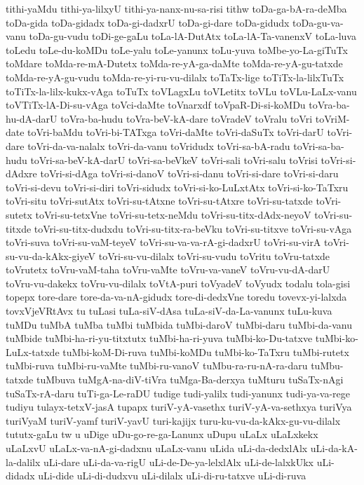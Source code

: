 {tithi-yaMdu
tithi-ya-lilxyU
tithi-ya-nanx-nu-sa-risi
tithw
toDa-ga-bA-ra-deMba
toDa-gida
toDa-gidadx
toDa-gi-dadxrU
toDa-gi-dare
toDa-gidudx
toDa-gu-va-vanu
toDa-gu-vudu
toDi-ge-gaLu
toLa-lA-DutAtx
toLa-lA-Ta-vanenxV
toLa-luva
toLedu
toLe-du-koMDu
toLe-yalu
toLe-yanunx
toLu-yuva
toMbe-yo-La-giTuTx
toMdare
toMda-re-mA-Dutetx
toMda-re-yA-ga-daMte
toMda-re-yA-gu-tatxde
toMda-re-yA-gu-vudu
toMda-re-yi-ru-vu-dilalx
toTaTx-lige
toTiTx-la-lilxTuTx
toTiTx-la-lilx-kukx-vAga
toTuTx
toVLagxLu
toVLetitx
toVLu
toVLu-LaLx-vanu
toVTiTx-lA-Di-su-vAga
toVci-daMte
toVnarxdf
toVpaR-Di-si-koMDu
toVra-ba-hu-dA-darU
toVra-ba-hudu
toVra-beV-kA-dare
toVradeV
toVralu
toVri
toVriM-date
toVri-baMdu
toVri-bi-TATxga
toVri-daMte
toVri-daSuTx
toVri-darU
toVri-dare
toVri-da-va-nalalx
toVri-da-vanu
toVridudx
toVri-sa-bA-radu
toVri-sa-ba-hudu
toVri-sa-beV-kA-darU
toVri-sa-beVkeV
toVri-sali
toVri-salu
toVrisi
toVri-si-dAdxre
toVri-si-dAga
toVri-si-danoV
toVri-si-danu
toVri-si-dare
toVri-si-daru
toVri-si-devu
toVri-si-diri
toVri-sidudx
toVri-si-ko-LuLxtAtx
toVri-si-ko-TaTxru
toVri-situ
toVri-sutAtx
toVri-su-tAtxne
toVri-su-tAtxre
toVri-su-tatxde
toVri-sutetx
toVri-su-tetxVne
toVri-su-tetx-neMdu
toVri-su-titx-dAdx-neyoV
toVri-su-titxde
toVri-su-titx-dudxdu
toVri-su-titx-ra-beVku
toVri-su-titxve
toVri-su-vAga
toVri-suva
toVri-su-vaM-teyeV
toVri-su-va-va-rA-gi-dadxrU
toVri-su-virA
toVri-su-vu-da-kAkx-giyeV
toVri-su-vu-dilalx
toVri-su-vudu
toVritu
toVru-tatxde
toVrutetx
toVru-vaM-taha
toVru-vaMte
toVru-va-vaneV
toVru-vu-dA-darU
toVru-vu-dakekx
toVru-vu-dilalx
toVtA-puri
toVyadeV
toVyudx
todalu
tola-gisi
topepx
tore-dare
tore-da-va-nA-gidudx
tore-di-dedxVne
toredu
tovevx-yi-lalxda
tovxVjeVRtAvx
tu
tuLasi
tuLa-siV-dAsa
tuLa-siV-da-La-vanunx
tuLu-kuva
tuMDu
tuMbA
tuMba
tuMbi
tuMbida
tuMbi-daroV
tuMbi-daru
tuMbi-da-vanu
tuMbide
tuMbi-ha-ri-yu-titxtutx
tuMbi-ha-ri-yuva
tuMbi-ko-Du-tatxve
tuMbi-ko-LuLx-tatxde
tuMbi-koM-Di-ruva
tuMbi-koMDu
tuMbi-ko-TaTxru
tuMbi-rutetx
tuMbi-ruva
tuMbi-ru-vaMte
tuMbi-ru-vanoV
tuMbu-ra-ru-nA-ra-daru
tuMbu-tatxde
tuMbuva
tuMgA-na-diV-tiVra
tuMga-Ba-derxya
tuMturu
tuSaTx-nAgi
tuSaTx-rA-daru
tuTi-ga-Le-raDU
tudige
tudi-yalilx
tudi-yanunx
tudi-ya-va-rege
tudiyu
tulayx-tetxV-jasA
tupapx
turiV-yA-vasethx
turiV-yA-va-sethxya
turiVya
turiVyaM
turiV-yamf
turiV-yavU
turi-kajijx
turu-ku-vu-da-kAkx-gu-vu-dilalx
tututx-gaLu
tw
u
uDige
uDu-go-re-ga-Lanunx
uDupu
uLaLx
uLaLxkekx
uLaLxvU
uLaLx-va-nA-gi-dadxnu
uLaLx-vanu
uLida
uLi-da-dedxlAlx
uLi-da-kA-la-dalilx
uLi-dare
uLi-da-va-rigU
uLi-de-De-ya-lelxlAlx
uLi-de-lalxkUkx
uLi-didadx
uLi-dide
uLi-di-dudxvu
uLi-dilalx
uLi-di-ru-tatxve
uLi-di-ruva
}
